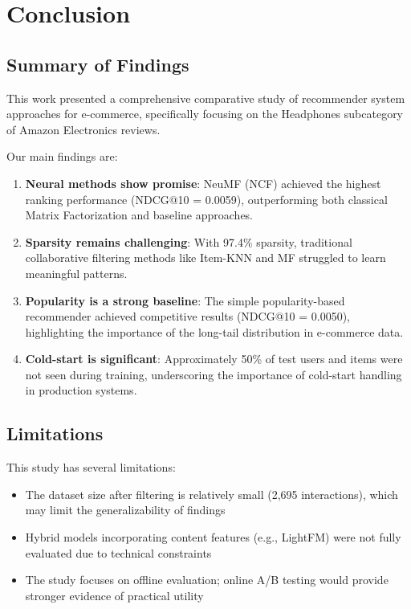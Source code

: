 %
%
\chapter{Conclusion}
\label{chap:conclusion}
\setlength{\parskip}{1em}

\section{Summary of Findings}

This work presented a comprehensive comparative study of recommender system approaches for e-commerce, specifically focusing on the Headphones subcategory of Amazon Electronics reviews.

Our main findings are:
\begin{enumerate}
    \item \textbf{Neural methods show promise}: NeuMF (NCF) achieved the highest ranking performance (NDCG@10 = 0.0059), outperforming both classical Matrix Factorization and baseline approaches.
    
    \item \textbf{Sparsity remains challenging}: With 97.4\% sparsity, traditional collaborative filtering methods like Item-KNN and MF struggled to learn meaningful patterns.
    
    \item \textbf{Popularity is a strong baseline}: The simple popularity-based recommender achieved competitive results (NDCG@10 = 0.0050), highlighting the importance of the long-tail distribution in e-commerce data.
    
    \item \textbf{Cold-start is significant}: Approximately 50\% of test users and items were not seen during training, underscoring the importance of cold-start handling in production systems.
\end{enumerate}

\section{Limitations}

This study has several limitations:
\begin{itemize}
    \item The dataset size after filtering is relatively small (2,695 interactions), which may limit the generalizability of findings
    \item Hybrid models incorporating content features (e.g., LightFM) were not fully evaluated due to technical constraints
    \item The study focuses on offline evaluation; online A/B testing would provide stronger evidence of practical utility
\end{itemize}

